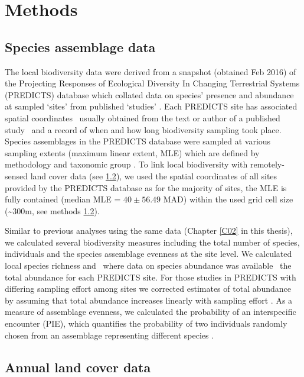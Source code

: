\section{Methods}
\label{C04_02}
\subsection{Species assemblage data}
\label{C04_0201}

The local biodiversity data were derived from a snapshot (obtained Feb 2016) of the Projecting Responses of Ecological Diversity In Changing Terrestrial Systems (PREDICTS) database which collated data on species’ presence and abundance at sampled ‘sites’ from published ‘studies’ \citep{Hudson2016}. Each PREDICTS site has associated spatial coordinates \textendash\ usually obtained from the text or author of a published study \textendash\ and a record of when and how long biodiversity sampling took place. Species assemblages in the PREDICTS database were sampled at various sampling extents (maximum linear extent, MLE) which are defined by methodology and taxonomic group \citep{Hudson2014}. To link local biodiversity with remotely-sensed land cover data (see \ref{C04_0202}), we used the spatial coordinates of all sites provided by the PREDICTS database as for the majority of sites, the MLE is fully contained (median MLE = $40 \pm 56.49$ MAD) within the used grid cell size (\textasciitilde 300m, see methods \ref{C04_0202}).   

Similar to previous analyses using the same data (\eg Chapter \ref{C02} in this thesis), we calculated several biodiversity measures including the total number of species, individuals and the species assemblage evenness at the site level. We calculated local species richness and \textendash\ where data on species abundance was available \textendash\ the total abundance for each PREDICTS site. For those studies in PREDICTS with differing sampling effort among sites we corrected estimates of total abundance by assuming that total abundance increases linearly with sampling effort \citep{Newbold2014b,Newbold2015}. As a measure of assemblage evenness, we calculated the probability of an interspecific encounter (PIE), which quantifies the probability of two individuals randomly chosen from an assemblage representing different species \citep{Hurlbert1971}. 

\subsection{Annual land cover data}
\label{C04_0202}

